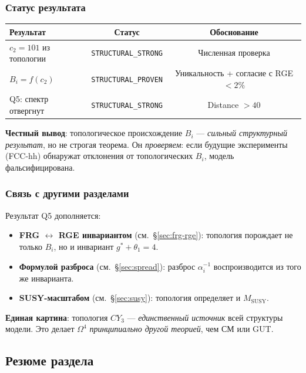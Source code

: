 \documentclass[11pt,a4paper]{article}
\newcommand{\CY}{\ensuremath{CY_3}}
\newcommand{\Om}{\ensuremath{\Omega^4}}
\theoremstyle{definition}
\begin{document}
\subsubsection{Статус результата}

\begin{center}
\begin{tabular}{lcc}
\toprule
Результат & Статус & Обоснование \\
\midrule
$c_2 = 101$ из топологии & \texttt{STRUCTURAL\_STRONG} &
Численная проверка \\
$B_i = f(c_2)$ & \texttt{STRUCTURAL\_PROVEN} &
Уникальность + согласие с RGE $< 2\%$ \\
Q5: спектр отвергнут & \texttt{STRUCTURAL\_STRONG} &
Distance $> 40$ \\
\bottomrule
\end{tabular}
\end{center}

\medskip\noindent
\textbf{Честный вывод}: топологическое происхождение $B_i$ ---
\emph{сильный структурный результат}, но не строгая теорема.
Он \emph{проверяем}: если будущие эксперименты (FCC-hh)
обнаружат отклонения от топологических $B_i$, модель
фальсифицирована.

\subsubsection{Связь с другими разделами}

Результат Q5 дополняется:
\begin{itemize}
    \item \textbf{FRG $\leftrightarrow$ RGE инвариантом}
          (см.~\S\ref{sec:frg-rge}): топология порождает
          не только $B_i$, но и инвариант $g^* + \theta_1 = 4$.
    \item \textbf{Формулой разброса} (см.~\S\ref{sec:spread}):
          разброс $\alpha_i^{-1}$ воспроизводится из
          того же инварианта.
    \item \textbf{SUSY-масштабом} (см.~\S\ref{sec:susy}):
          топология определяет и $M_{\text{SUSY}}$.
\end{itemize}

\medskip\noindent
\textbf{Единая картина}: топология $\CY$ --- \emph{единственный
источник} всей структуры модели. Это делает $\Om$ \emph{принципиально
другой теорией}, чем СМ или GUT.

\subsection{Резюме раздела}
\label{subsec:bi-summary}
\end{document}
